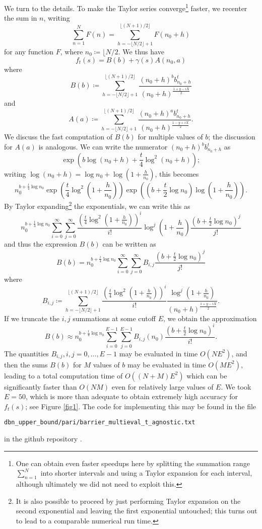 We turn to the details.  To make the Taylor series converge\footnote{One can obtain even faster speedups here by splitting the summation range $\sum_{n=1}^N$ into shorter intervals and using a Taylor expansion for each interval, although ultimately we did not need to exploit this.} faster, we recenter the sum in $n$, writing
$$ \sum_{n=1}^N F(n) = \sum_{h=-\lfloor N/2\rfloor+1}^{\lfloor (N+1)/2\rfloor} F(n_0 + h)$$
for any function $F$, where $n_0 \coloneqq \lfloor N/2$.  We thus have
$$ f_t(s) = B(b) + \gamma(s) A(n_0,a)$$
where
$$ B(b) \coloneqq \sum_{h=-\lfloor N/2\rfloor+1}^{\lfloor (N+1)/2\rfloor} \frac{(n_0+h)^b b_{n_0+h}^t}{(n_0+h)^{\frac{1+y-iX}{2}}}$$
and
$$ A(a) \coloneqq \sum_{h=-\lfloor N/2\rfloor+1}^{\lfloor (N+1)/2\rfloor} \frac{(n_0+h)^a b_{n_0+h}^t}{(n_0+h)^{\frac{1-y+iX}{2}}}.$$
We discuss the fast computation of $B(b)$ for multiple values of $b$; the discussion for $A(a)$ is analogous.  We can write the numerator $(n_0+h)^b b_{n_0+h}^t$ as
$$ \exp( b \log(n_0+h) + \frac{t}{4} \log^2(n_0+h) );$$
writing $\log(n_0+h) = \log n_0 + \log(1+\frac{h}{n_0})$, this becomes
$$ n_0^{b + \frac{t}{4} \log n_0} \exp( \frac{t}{4} \log^2(1+\frac{h}{n_0}) ) \exp( (b + \frac{t}{2} \log n_0) \log(1+\frac{h}{n_0}) ).$$
By Taylor expanding\footnote{It is also possible to proceed by just performing Taylor expansion on the second exponential and leaving the first exponential untouched; this turns out to lead to a comparable numerical run time.} the exponentials, we can write this as
$$ n_0^{b + \frac{t}{4} \log n_0} \sum_{i=0}^\infty \sum_{j=0}^\infty \frac{( \frac{t}{4} \log^2(1+\frac{h}{n_0}) )^i}{i!} \log^j(1+\frac{h}{n_0}) \frac{(b+\frac{t}{2} \log n_0)^j}{j!}$$
and thus the expression $B(b)$ can be written as
$$ B(b) = n_0^{b + \frac{t}{4} \log n_0} \sum_{i=0}^\infty \sum_{j=0}^\infty B_{i,j} \frac{(b+\frac{t}{2} \log n_0)^j}{j!}$$
where
$$ B_{i,j} \coloneqq \sum_{h=-\lfloor N/2\rfloor+1}^{\lfloor (N+1)/2\rfloor} \frac{( \frac{t}{4} \log^2(1+\frac{h}{n_0}) )^i}{i!} \frac{\log^j(1+\frac{h}{n_0})}{(n_0+h)^{\frac{1+y-iX}{2}}}.$$
If we truncate the $i,j$ summations at some cutoff $E$, we obtain the approximation
$$ B(b) \approx n_0^{b + \frac{t}{4} \log n_0} \sum_{i=0}^{E-1} \sum_{j=0}^{E-1} B_{i,j}(n_0) \frac{(b+\frac{t}{2} \log n_0)^i}{i!}.$$
The quantities $B_{i,j}, i,j=0,\dots,{E-1}$ may be evaluated in time $O(N E^2)$, and then the sums $B(b)$ for $M$ values of $b$ may be evaluated in time $O(ME^2)$, leading to a total computation time of $O((N+M) E^2)$ which can be significantly faster than $O(NM)$ even for relatively large values of $E$.  We took $E=50$, which is more than adequate to obtain extremely high accuracy for $f_t(s)$; see Figure \ref{fig1}.  The code for implementing this may be found in the file

\centerline{\tt dbn\_upper\_bound/pari/barrier\_multieval\_t\_agnostic.txt}

in the github repository \cite{github}.

